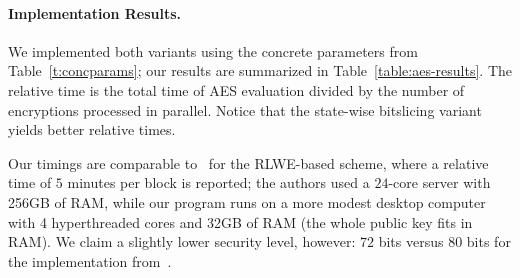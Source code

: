 \documentclass{llncs}
\newcommand*\swbs{state-wise bitslicing\xspace}
\begin{document}
\paragraph{Implementation Results.} We implemented both variants
using the concrete parameters from Table~\ref{t:concparams}; our
results are summarized in 
Table~\ref{table:aes-results}. The 
relative time is the total time of AES evaluation divided  by the
number of encryptions processed in parallel. Notice that the \swbs variant
yields  better relative times. 

Our timings are comparable to~\cite{GHS2012c} for the RLWE-based scheme, where a relative time of $5$ minutes per block is
reported; the authors used a $24$-core server with 256GB of RAM, while
our program runs on a more modest desktop computer with 4 hyperthreaded cores and
32GB of RAM (the whole public key fits in RAM).
We claim a slightly lower security level, however: $72$ bits versus $80$
bits for the implementation from~\cite{GHS2012c}.

%


\end{document}

